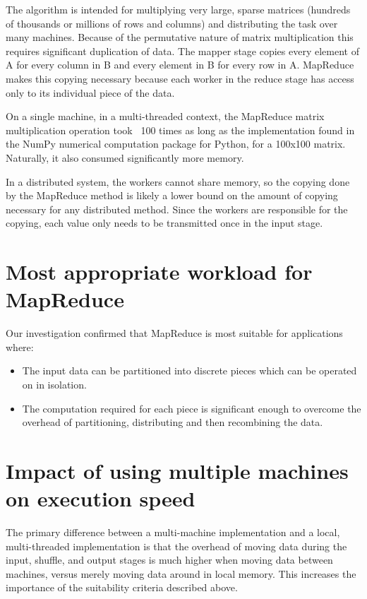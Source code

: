 \documentclass[12pt, letterpaper]{article}
\begin{document}
The algorithm is intended for multiplying very large, sparse matrices (hundreds of thousands or millions of rows and columns) and distributing the task over many machines. Because of the permutative nature of matrix multiplication this requires significant duplication of data. The mapper stage copies every element of A for every column in B and every element in B for every row in A. MapReduce makes this copying necessary because each worker in the reduce stage has access only to its individual piece of the data. 

On a single machine, in a multi-threaded context, the MapReduce matrix multiplication operation took ~100 times as long as the implementation found in the NumPy numerical computation package for Python, for a 100x100 matrix. Naturally, it also consumed significantly more memory. 

In a distributed system, the workers cannot share memory, so the copying done by the MapReduce method is likely a lower bound on the amount of copying necessary for any distributed method. Since the workers are responsible for the copying, each value only needs to be transmitted once in the input stage. 

	
\section{Most appropriate workload for MapReduce}
Our investigation confirmed that MapReduce is most suitable for applications where:
\begin{itemize}
\item The input data can be partitioned into discrete pieces which can be operated on in isolation. 
\item The computation required for each piece is significant enough to overcome the overhead of partitioning, distributing and then recombining the data. 
\end{itemize}
	
\section{Impact of using multiple machines on execution speed}
The primary difference between a multi-machine implementation and a local, multi-threaded implementation is that the overhead of moving data during the input, shuffle, and output stages is much higher when moving data between machines, versus merely moving data around in local memory. This increases the importance of the suitability criteria described above. 
\end{document}
